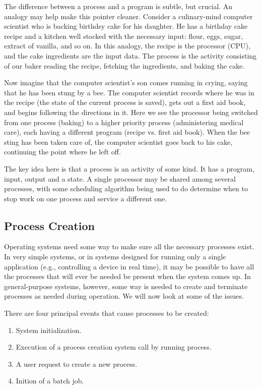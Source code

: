 \documentclass{book}
\begin{document}
The difference between a process and a program is subtle, but crucial.
An analogy may help make this pointer cleaner.
Consider a culinary-mind computer scientist who is backing birthdsy cake for his daughter.
He has a birthday cake recipe and a kitchen well stocked with the necessary input:
flour, eggs, sugar, extract of vanilla, and so on.
In this analogy, the recipe is the processor (CPU), and the cake ingredients are the input data.
The process is the activity consisting of our baker reading the recipe, fetching the ingredients, and baking the cake.
 
Now imagine that the computer scientist's son comes running in crying, saying that he has been stung by a bee.
The computer scientist records where he was in the recipe (the state of the current process is saved),
gets out a first aid book, and begins following the directions in it.
Here we see the processor being switched from one process (baking) to a higher priority process (administering medical care),
each having a different program (recipe vs. first aid book).
When the bee sting has been taken care of, the computer scientist goes back to his cake,
continuing the point where he left off.

The key idea here is that a process is an activity of some kind.
It has a program, input, output and a state.
A single processor may be shared among several processes, with some scheduling algorithm being used to do determine
when to stop work on one process and service a different one.

\subsection{Process Creation}
Operating systems need some way to make sure all the necessary processes exist.
In very simple systems, or in systems designed for running only a single application (e.g., controlling a device in real time),
it may be possible to have all the processes that will ever be needed be present when the system comes up.
In general-purpose systems, however, some way is needed to create and terminate processes as needed during operation.
We will now look at some of the issues.

There are four principal events that cause processes to be created:
\begin{enumerate}
  \item System initialization.
  \item Execution of a process creation system call by running process.
  \item A user request to create a new process.
  \item Inition of a batch job.
\end{enumerate}
\end{document}
